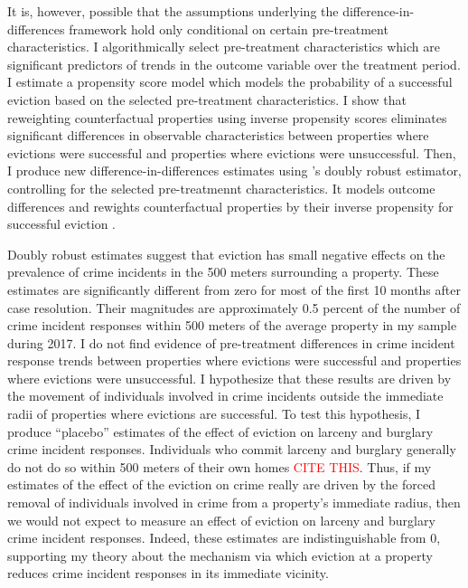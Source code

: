 \documentclass[12pt]{article}
\begin{document}
It is, however, possible that the assumptions underlying the difference-in-differences framework hold only conditional on certain pre-treatment characteristics. I algorithmically select pre-treatment characteristics which are significant predictors of trends in the outcome variable over the treatment period. I estimate a propensity score model which models the probability of a successful eviction based on the selected pre-treatment characteristics. I show that reweighting counterfactual properties using inverse propensity scores eliminates significant differences in observable characteristics between properties where evictions were successful and properties where evictions were unsuccessful. Then, I produce new difference-in-differences estimates using \cite{santanna_doubly_2020}'s doubly robust estimator, controlling for the selected pre-treatmennt characteristics. It models outcome differences and rewights counterfactual properties by their inverse propensity for successful eviction \citep{santanna_doubly_2020}. 


Doubly robust estimates suggest that eviction has small negative effects on the prevalence of crime incidents in the 500 meters surrounding a property. These estimates are significantly different from zero for most of the first 10 months after case resolution. Their magnitudes are approximately 0.5 percent of the number of crime incident responses within 500 meters of the average property in my sample during 2017. I do not find evidence of pre-treatment differences in crime incident response trends between properties where evictions were successful and properties where evictions were unsuccessful. I hypothesize that these results are driven by the movement of individuals involved in crime incidents outside the immediate radii of properties where evictions are successful. To test this hypothesis, I produce ``placebo'' estimates of the effect of eviction on larceny and burglary crime incident responses. Individuals who commit larceny and burglary generally do not do so within 500 meters of their own homes \textcolor{red}{CITE THIS}. Thus, if my estimates of the effect of the eviction on crime really are driven by the forced removal of individuals involved in crime from a property's immediate radius, then we would not expect to measure an effect of eviction on larceny and burglary crime incident responses. Indeed, these estimates are indistinguishable from 0, supporting my theory about the mechanism via which eviction at a property reduces crime incident responses in its immediate vicinity.
\end{document}
